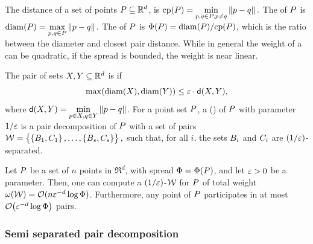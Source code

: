 \documentclass[12pt]{article}%
\begin{document}
The  distance of a set of points
$P \subseteq \mathbb{R}^d$, is
\begin{math}
    \cpX{\PS} = \underset{\pa, \pb \in \PS, \pa \neq \pb}{\min}
    \dY{\pa}{\pb}.
\end{math}
The  of $P$ is
\begin{math}
    \diamX{\PS} = \underset{\pa, \pb \in \PS}{\max}\dY{\pa}{\pb}.
\end{math}
The  of $P$ is
$\spreadX{\PS} = \diamX{\PS} / \cpX{\PS}$, which is the ratio between
the diameter and closest pair distance.  While in general the weight
of a \WSPD can be quadratic, if the spread is bounded, the weight is
near linear.

\begin{defn}
    The pair of sets $X, Y \subseteq \mathbb{R}^d$ is
     if
    \begin{equation*}
        \max \pth{ \diameterX{\PSX}, \diameterX{\PSY} } \leq
        \eps \cdot \dsY{\PSX}{\PSY},
    \end{equation*}
    where
    $\dsY{\PSX}{\PSY} = \underset{\pa \in \PSX, \pb \in \PSY}{\min}
    \dY{\pa}{\pb}$.  For a point set $P$, a  (\emphOnly{\WSPD{}}) of $P$ with
    parameter $1/\varepsilon$ is a pair decomposition of $P$ with a set of
    pairs
    \begin{math}
        \mathcal{W} = \left\{ {\bigl.
           \left\{ {B_1,C_1} \right\},\ldots,\left\{ {B_s,C_s} \right\}} \right\},
    \end{math}
    such that, for all $i$, the sets $B_i$ and $C_i$ are
    $(1/\varepsilon)$-separated.
\end{defn}


\begin{lemma}
    Let $P$ be a set of $n$ points in $\Re^d$, with spread
    $\spread = \spreadX{\PS}$, and let $\varepsilon > 0$ be a
    parameter. Then, one can compute a $(1/\varepsilon)$-\WSPD $\mathcal{W}$ for
    $P$ of total weight
    $\WeightX{\WS} = \Of(n \eps^{-d} \log \spread)$. Furthermore, any
    point of $P$ participates in at most
    $\Of\pth{ \eps^{-d} \log \spread}$ pairs.
\end{lemma}

\subsubsection{Semi separated pair decomposition}
\end{document}
